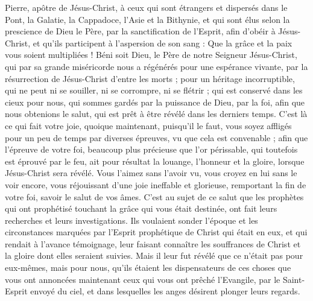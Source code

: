 \begin{multicols}{2}
\VerseOne{}Pierre, apôtre de Jésus-Christ, à ceux qui sont étrangers et dispersés dans le Pont, la Galatie, la Cappadoce, l'Asie et la Bithynie,
et qui sont élus selon la prescience de Dieu le Père, par la sanctification de l'Esprit, afin d'obéir à Jésus-Christ, et qu'ils participent à l'aspersion de son sang : Que la grâce et la paix vous soient multipliées !
Béni soit Dieu, le Père de notre Seigneur Jésus-Christ, qui par sa grande miséricorde nous a régénérés pour une espérance vivante, par la résurrection de Jésus-Christ d'entre les morts ;
pour un héritage incorruptible, qui ne peut ni se souiller, ni se corrompre, ni se flétrir ; qui est conservé dans les cieux pour nous,
qui sommes gardés par la puissance de Dieu, par la foi, afin que nous obtenions le salut, qui est prêt à être révélé dans les derniers temps.
C'est là ce qui fait votre joie, quoique maintenant, puisqu'il le faut, vous soyez affligés pour un peu de temps par diverses épreuves, vu que cela est convenable ;
afin que l'épreuve de votre foi, beaucoup plus précieuse que l'or périssable, qui toutefois est éprouvé par le feu, ait pour résultat la louange, l'honneur et la gloire, lorsque Jésus-Christ sera révélé.
Vous l'aimez sans l'avoir vu, vous croyez en lui sans le voir encore, vous réjouissant d'une joie ineffable et glorieuse,
remportant la fin de votre foi, savoir le salut de vos âmes.
C'est au sujet de ce salut que les prophètes qui ont prophétisé touchant la grâce qui vous était destinée, ont fait leurs recherches et leurs investigations.
Ils voulaient sonder l'époque et les circonstances marquées par l'Esprit prophétique de Christ qui était en eux, et qui rendait à l'avance témoignage, leur faisant connaître les souffrances de Christ et la gloire dont elles seraient suivies.
Mais il leur fut révélé que ce n'était pas pour eux-mêmes, mais pour nous, qu'ils étaient les dispensateurs de ces choses que vous ont annoncées maintenant ceux qui vous ont prêché l'Evangile, par le Saint-Esprit envoyé du ciel, et dans lesquelles les anges désirent plonger leurs regards.

\end{multicols}
